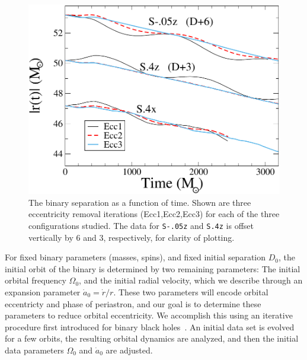 \begin{figure}
  \includegraphics[width=0.95\columnwidth]{chap2/DvT2}\caption[Binary separation as a function of time.]{
{\label{fig:DvT}}
The
    binary separation as a function of time. Shown are three
    eccentricity removal iterations (Ecc1,Ecc2,Ecc3) for each of the
    three configurations studied. The data for {\tt S-.05z} and {\tt S.4z} is
    offset vertically by 6 and 3, respectively, for clarity of
    plotting.}
\end{figure}


For fixed binary parameters (masses, spins), and fixed initial
separation $D_0$, the initial orbit of the binary is determined by two
remaining parameters: The initial orbital frequency $\Omega_0$, and
the initial radial velocity, which we describe through an expansion
parameter $\dot{a}_0 = \dot{r}/r$. These two parameters will encode
orbital eccentricty and phase of periastron, and our goal is to
determine these parameters to reduce orbital eccentricity. We
accomplish this using an iterative procedure first introduced
  for binary black holes~\citep{Boyle2007,Buonanno:2010yk}. An initial
data set is evolved for a few orbits, the resulting orbital dynamics
are analyzed, and then the initial data parameters $\Omega_0$ and
$\dot a_0$ are adjusted.


